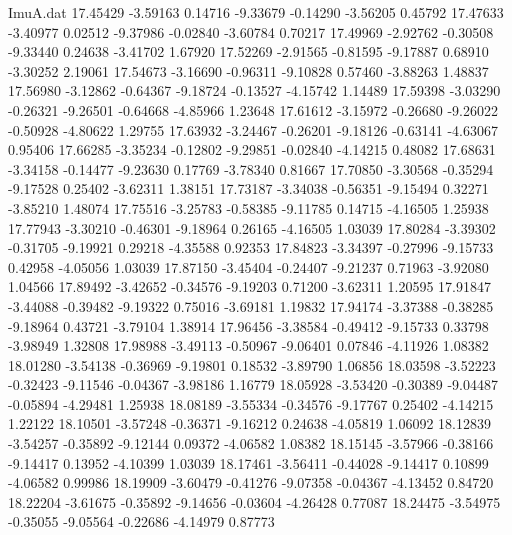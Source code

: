 \begin{filecontents}{ImuA.dat}
  17.45429   -3.59163    0.14716   -9.33679   -0.14290   -3.56205    0.45792
  17.47633   -3.40977    0.02512   -9.37986   -0.02840   -3.60784    0.70217
  17.49969   -2.92762   -0.30508   -9.33440    0.24638   -3.41702    1.67920
  17.52269   -2.91565   -0.81595   -9.17887    0.68910   -3.30252    2.19061
  17.54673   -3.16690   -0.96311   -9.10828    0.57460   -3.88263    1.48837
  17.56980   -3.12862   -0.64367   -9.18724   -0.13527   -4.15742    1.14489
  17.59398   -3.03290   -0.26321   -9.26501   -0.64668   -4.85966    1.23648
  17.61612   -3.15972   -0.26680   -9.26022   -0.50928   -4.80622    1.29755
  17.63932   -3.24467   -0.26201   -9.18126   -0.63141   -4.63067    0.95406
  17.66285   -3.35234   -0.12802   -9.29851   -0.02840   -4.14215    0.48082
  17.68631   -3.34158   -0.14477   -9.23630    0.17769   -3.78340    0.81667
  17.70850   -3.30568   -0.35294   -9.17528    0.25402   -3.62311    1.38151
  17.73187   -3.34038   -0.56351   -9.15494    0.32271   -3.85210    1.48074
  17.75516   -3.25783   -0.58385   -9.11785    0.14715   -4.16505    1.25938
  17.77943   -3.30210   -0.46301   -9.18964    0.26165   -4.16505    1.03039
  17.80284   -3.39302   -0.31705   -9.19921    0.29218   -4.35588    0.92353
  17.84823   -3.34397   -0.27996   -9.15733    0.42958   -4.05056    1.03039
  17.87150   -3.45404   -0.24407   -9.21237    0.71963   -3.92080    1.04566
  17.89492   -3.42652   -0.34576   -9.19203    0.71200   -3.62311    1.20595
  17.91847   -3.44088   -0.39482   -9.19322    0.75016   -3.69181    1.19832
  17.94174   -3.37388   -0.38285   -9.18964    0.43721   -3.79104    1.38914
  17.96456   -3.38584   -0.49412   -9.15733    0.33798   -3.98949    1.32808
  17.98988   -3.49113   -0.50967   -9.06401    0.07846   -4.11926    1.08382
  18.01280   -3.54138   -0.36969   -9.19801    0.18532   -3.89790    1.06856
  18.03598   -3.52223   -0.32423   -9.11546   -0.04367   -3.98186    1.16779
  18.05928   -3.53420   -0.30389   -9.04487   -0.05894   -4.29481    1.25938
  18.08189   -3.55334   -0.34576   -9.17767    0.25402   -4.14215    1.22122
  18.10501   -3.57248   -0.36371   -9.16212    0.24638   -4.05819    1.06092
  18.12839   -3.54257   -0.35892   -9.12144    0.09372   -4.06582    1.08382
  18.15145   -3.57966   -0.38166   -9.14417    0.13952   -4.10399    1.03039
  18.17461   -3.56411   -0.44028   -9.14417    0.10899   -4.06582    0.99986
  18.19909   -3.60479   -0.41276   -9.07358   -0.04367   -4.13452    0.84720
  18.22204   -3.61675   -0.35892   -9.14656   -0.03604   -4.26428    0.77087
  18.24475   -3.54975   -0.35055   -9.05564   -0.22686   -4.14979    0.87773

\end{filecontents}
